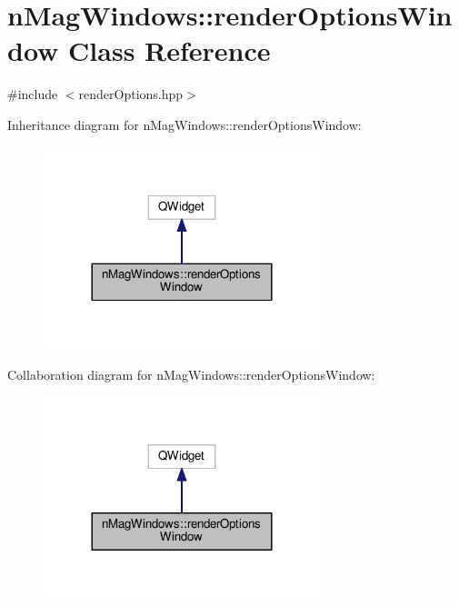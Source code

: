 \hypertarget{classnMagWindows_1_1renderOptionsWindow}{}\section{n\+Mag\+Windows\+:\+:render\+Options\+Window Class Reference}
\label{classnMagWindows_1_1renderOptionsWindow}


{\ttfamily \#include $<$render\+Options.\+hpp$>$}



Inheritance diagram for n\+Mag\+Windows\+:\+:render\+Options\+Window\+:
\nopagebreak
\begin{figure}[H]
\begin{center}
\leavevmode
\includegraphics[width=228pt]{d1/d6c/classnMagWindows_1_1renderOptionsWindow__inherit__graph}
\end{center}
\end{figure}


Collaboration diagram for n\+Mag\+Windows\+:\+:render\+Options\+Window\+:
\nopagebreak
\begin{figure}[H]
\begin{center}
\leavevmode
\includegraphics[width=228pt]{d4/da3/classnMagWindows_1_1renderOptionsWindow__coll__graph}
\end{center}
\end{figure}
